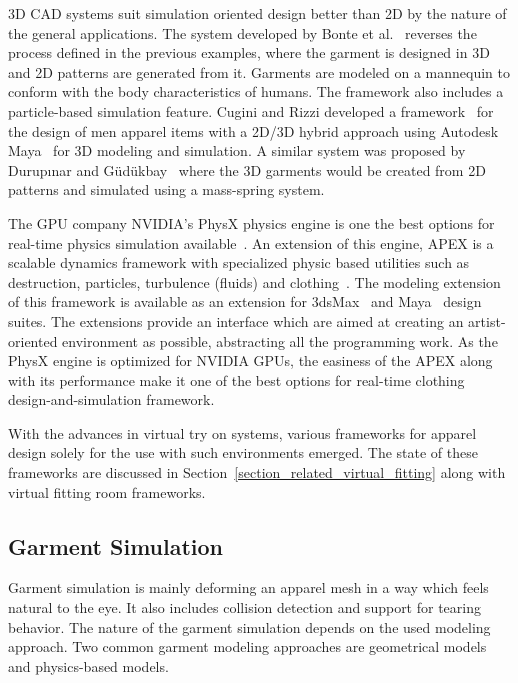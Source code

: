  3D CAD systems suit simulation oriented design better than 2D by the nature of the general applications. The system developed by Bonte et al.~\cite{Bonte2002} reverses the process defined in the previous examples, where the garment is designed in 3D and 2D patterns are generated from it. Garments are modeled on a mannequin to conform with the body characteristics of humans. The framework also includes a particle-based simulation feature. Cugini and Rizzi developed a framework~\cite{Cugini2002} for the design of men apparel items with a 2D/3D hybrid approach using Autodesk Maya~\cite{Autodesk2013} for 3D modeling and simulation. A similar system was proposed by Durup{\i}nar and G{\"u}d{\"u}kbay~\cite{Durupinar2007} where the 3D garments  would be created from 2D patterns and simulated using a mass-spring system.
 
 The GPU company NVIDIA's PhysX physics engine is one the best options for real-time physics simulation available~\cite{WikiPhysx2012}. An extension of this engine, APEX is a scalable dynamics framework with specialized physic based utilities such as destruction, particles, turbulence (fluids) and clothing~\cite{Nvidia2013}. The modeling extension of this framework is available as an extension for 3dsMax~\cite{Autodesk3DS2013} and Maya~\cite{Autodesk2013} design suites. The extensions provide an interface which are aimed at creating an artist-oriented environment as possible, abstracting all the programming work. As the PhysX engine is optimized for NVIDIA GPUs, the easiness of the APEX along with its performance make it one of the  best options for real-time clothing design-and-simulation framework.  
 
With the advances in virtual try on systems, various frameworks for apparel design solely for the use with such environments emerged. The state of these frameworks are discussed in Section~\ref{section_related_virtual_fitting} along with virtual fitting room frameworks.  
   
\subsection{Garment Simulation}
Garment simulation is mainly deforming an apparel mesh in a way which feels natural to the eye. It also includes collision detection and support for tearing behavior. The nature of the garment simulation depends on the used modeling approach. Two common garment modeling approaches are geometrical models~\cite{Weil1986} and physics-based models. 

